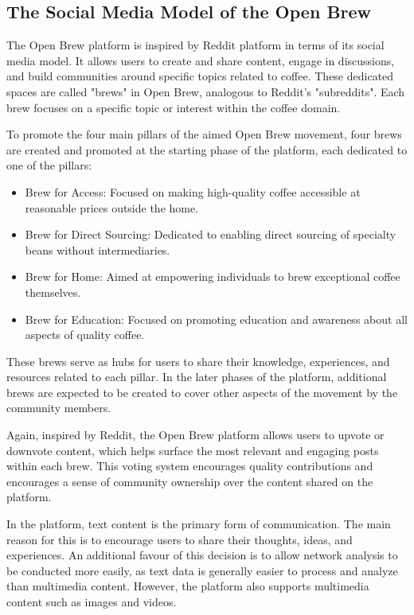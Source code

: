 \documentclass[12pt]{article}
\begin{document}
\subsection{The Social Media Model of the Open Brew}
\label{subsection:social_media_model_of_the_open_brew}
The Open Brew platform is inspired by Reddit platform in terms of its social media model. It allows users to create and share content, engage in discussions, and build communities around specific topics related to coffee. These dedicated spaces are called "brews" in Open Brew, analogous to Reddit's "subreddits". Each brew focuses on a specific topic or interest within the coffee domain.

To promote the four main pillars of the aimed Open Brew movement, four brews are created and promoted at the starting phase of the platform, each dedicated to one of the pillars:

\begin{itemize}
    \item Brew for Access: Focused on making high-quality coffee accessible at reasonable prices outside the home.
    \item Brew for Direct Sourcing: Dedicated to enabling direct sourcing of specialty beans without intermediaries.
    \item Brew for Home: Aimed at empowering individuals to brew exceptional coffee themselves.
    \item Brew for Education: Focused on promoting education and awareness about all aspects of quality coffee.
\end{itemize}

These brews serve as hubs for users to share their knowledge, experiences, and resources related to each pillar. In the later phases of the platform, additional brews are expected to be created to cover other aspects of the movement by the community members.

Again, inspired by Reddit, the Open Brew platform allows users to upvote or downvote content, which helps surface the most relevant and engaging posts within each brew. This voting system encourages quality contributions and encourages a sense of community ownership over the content shared on the platform.

In the platform, text content is the primary form of communication. The main reason for this is to encourage users to share their thoughts, ideas, and experiences. An additional favour of this decision is to allow network analysis to be conducted more easily, as text data is generally easier to process and analyze than multimedia content. However, the platform also supports multimedia content such as images and videos.
\end{document}
